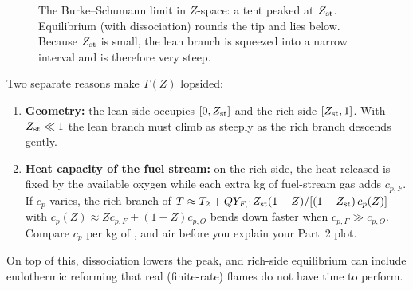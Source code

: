 \begin{figure}[H]
\centering
{}
\caption{The Burke--Schumann limit in $Z$-space: a tent peaked at $Z_{\mathrm{st}}$. Equilibrium (with
dissociation) rounds the tip and lies below. Because $Z_{\mathrm{st}}$ is small, the lean branch is squeezed into a
narrow interval and is therefore very steep.}
\label{fig:BS}
\end{figure}

\begin{intuition}[asymmetry of $T(Z)$]
Two separate reasons make $T(Z)$ lopsided:
\begin{enumerate}
  \item \textbf{Geometry:} the lean side occupies $[0,Z_{\mathrm{st}}]$ and the rich side $[Z_{\mathrm{st}},1]$. With $Z_{\mathrm{st}}\ll1$
        the lean branch must climb as steeply as the rich branch descends gently.
  \item \textbf{Heat capacity of the fuel stream:} on the rich side, the heat released is fixed by the
        available oxygen while each extra kg of fuel-stream gas adds $c_{p,F}$. If $c_p$ varies, the rich
        branch of $T\approx T_2+Q Y_{F,1}Z_{\mathrm{st}}(1-Z)/[(1-Z_{\mathrm{st}})\,c_p(Z)]$ with
        $c_p(Z)\approx Zc_{p,F}+(1-Z)c_{p,O}$ bends down faster when $c_{p,F}\gg c_{p,O}$. Compare
        $c_p$ per kg of ,  and air before you explain your Part~2 plot.
\end{enumerate}
On top of this, dissociation lowers the peak, and rich-side equilibrium can include endothermic
reforming that real (finite-rate) flames do not have time to perform.
\end{intuition}

